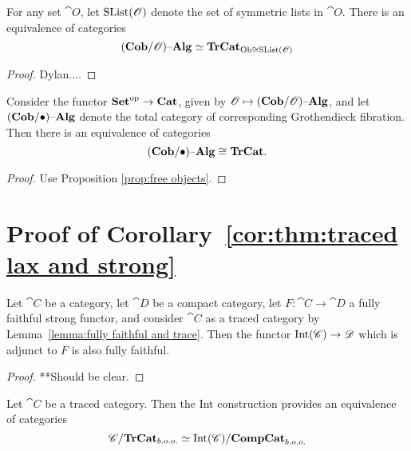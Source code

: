 \documentclass[12pt,oneside,article,draft]{memoir}
\begin{document}
\begin{theorem}
For any set $\cat{O}$, let $\textnormal{SList}(\mathscr{O})$ denote the set of symmetric lists in $\cat{O}$. There is an equivalence of categories 
 $$(\mathbf{Cob}/\mathscr{O}){\text \textendash}\mathbf{Alg}\simeq\mathbf{TrCat}_{{\operatorname{Ob}\cong}\textnormal{SList}(\mathscr{O})}$$
\end{theorem}
\begin{proof}
 Dylan....
\end{proof}

\begin{corollary}\label{cor:traced as cob-alg}

Consider the functor ${\mathbf{Set}}^{\text{op}}\to\mathbf{Cat}$, given by $\mathscr{O}\mapsto(\mathbf{Cob}/\mathscr{O}){\text \textendash}\mathbf{Alg}$, and let $(\mathbf{Cob}/\bullet){\text \textendash}\mathbf{Alg}$ denote the total category of corresponding Grothendieck fibration. Then there is an equivalence of categories
$$(\mathbf{Cob}/\bullet){\text \textendash}\mathbf{Alg}\cong\mathbf{TrCat}.$$

\end{corollary}

\begin{proof}

Use Proposition \ref{prop:free objects}.

\end{proof}

\section{Proof of Corollary~\ref{cor:thm:traced lax and strong}}





\begin{lemma}\label{lemma:more fully faithfulness}
	Let $\cat{C}$ be a category, let $\cat{D}$ be a compact category, let $F\colon\cat{C}\to\cat{D}$ a fully faithful strong functor, and consider $\cat{C}$ as a traced category by Lemma~\ref{lemma:fully faithful and trace}. Then the functor $\operatorname{Int}(\mathscr{C})\to\mathscr{D}$ which is adjunct to $F$ is also fully faithful.
\end{lemma}

\begin{proof}

**Should be clear.

\end{proof}

\begin{proposition}
	Let $\cat{C}$ be a traced category. Then the Int construction provides an equivalence of categories
	\[
		\mathscr{C}/\mathbf{TrCat}_{b.o.o.} \simeq \operatorname{Int}(\mathscr{C})/\mathbf{CompCat}_{b.o.o.}
	\]
\end{proposition}
\end{document}
